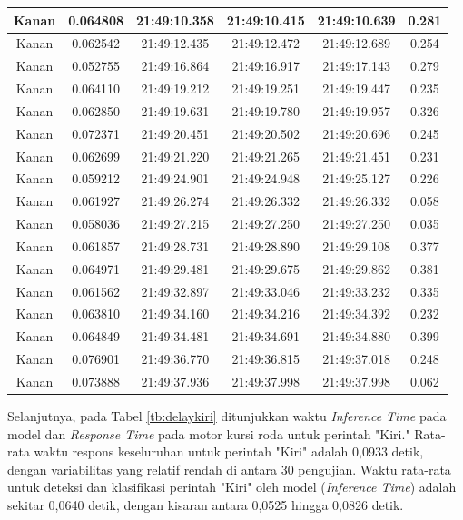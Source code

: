 \begin{longtable}{|c|c|c|c|c|c|}
      Kanan & 0.064808 & 21:49:10.358 & 21:49:10.415 & 21:49:10.639 & 0.281 \\ \hline
      Kanan & 0.062542 & 21:49:12.435 & 21:49:12.472 & 21:49:12.689 & 0.254 \\ \hline
      Kanan & 0.052755 & 21:49:16.864 & 21:49:16.917 & 21:49:17.143 & 0.279 \\ \hline
      Kanan & 0.064110 & 21:49:19.212 & 21:49:19.251 & 21:49:19.447 & 0.235 \\ \hline
      Kanan & 0.062850 & 21:49:19.631 & 21:49:19.780 & 21:49:19.957 & 0.326 \\ \hline
      Kanan & 0.072371  & 21:49:20.451 & 21:49:20.502 & 21:49:20.696 & 0.245 \\ \hline
      Kanan & 0.062699 & 21:49:21.220 & 21:49:21.265 & 21:49:21.451 & 0.231 \\ \hline
      Kanan & 0.059212 & 21:49:24.901 & 21:49:24.948 & 21:49:25.127 & 0.226 \\ \hline
      Kanan & 0.061927 & 21:49:26.274 & 21:49:26.332 & 21:49:26.332 & 0.058 \\ \hline
      Kanan & 0.058036 & 21:49:27.215 & 21:49:27.250 & 21:49:27.250 & 0.035 \\ \hline
      Kanan & 0.061857 & 21:49:28.731 & 21:49:28.890 & 21:49:29.108 & 0.377 \\ \hline
      Kanan & 0.064971 & 21:49:29.481 & 21:49:29.675 & 21:49:29.862 & 0.381 \\ \hline
      Kanan & 0.061562 & 21:49:32.897 & 21:49:33.046 & 21:49:33.232 & 0.335 \\ \hline
      Kanan & 0.063810 & 21:49:34.160 & 21:49:34.216 & 21:49:34.392 & 0.232 \\ \hline
      Kanan & 0.064849 & 21:49:34.481 & 21:49:34.691 & 21:49:34.880 & 0.399 \\ \hline
      Kanan & 0.076901 & 21:49:36.770 & 21:49:36.815 & 21:49:37.018 & 0.248 \\ \hline
      Kanan & 0.073888 & 21:49:37.936 & 21:49:37.998 & 21:49:37.998 & 0.062 \\ \hline
\end{longtable}

Selanjutnya, pada Tabel \ref{tb:delaykiri} ditunjukkan waktu \emph{Inference Time} pada model dan \emph{Response Time} pada motor kursi roda untuk perintah "Kiri." Rata-rata waktu respons keseluruhan untuk perintah "Kiri" adalah 0,0933 detik, dengan variabilitas yang relatif rendah di antara 30 pengujian. Waktu rata-rata untuk deteksi dan klasifikasi perintah "Kiri" oleh model (\emph{Inference Time}) adalah sekitar 0,0640 detik, dengan kisaran antara 0,0525 hingga 0,0826 detik.

